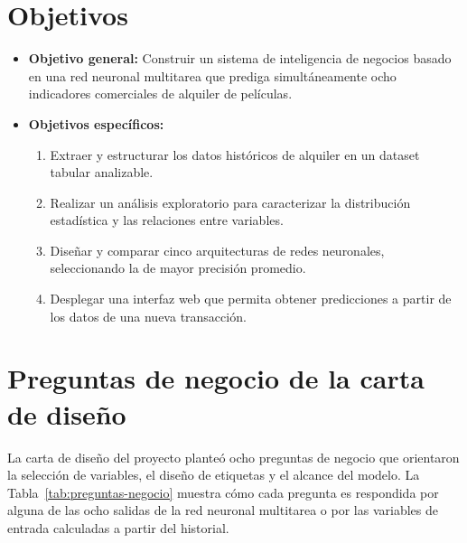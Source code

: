 \documentclass[12pt, a4paper]{report}
\begin{document}
\section{Objetivos}

\begin{itemize}
  \item \textbf{Objetivo general:} Construir un sistema de inteligencia de negocios basado en una red neuronal multitarea que prediga simultáneamente ocho indicadores comerciales de alquiler de películas.
  \item \textbf{Objetivos específicos:}
  \begin{enumerate}
    \item Extraer y estructurar los datos históricos de alquiler en un dataset tabular analizable.
    \item Realizar un análisis exploratorio para caracterizar la distribución estadística y las relaciones entre variables.
    \item Diseñar y comparar cinco arquitecturas de redes neuronales, seleccionando la de mayor precisión promedio.
    \item Desplegar una interfaz web que permita obtener predicciones a partir de los datos de una nueva transacción.
  \end{enumerate}
\end{itemize}

\section{Preguntas de negocio de la carta de diseño}
\label{sec:preguntas-negocio}

La carta de diseño del proyecto planteó ocho preguntas de negocio que orientaron la selección de variables, el diseño de etiquetas y el alcance del modelo. La Tabla~\ref{tab:preguntas-negocio} muestra cómo cada pregunta es respondida por alguna de las ocho salidas de la red neuronal multitarea o por las variables de entrada calculadas a partir del historial.
\end{document}
